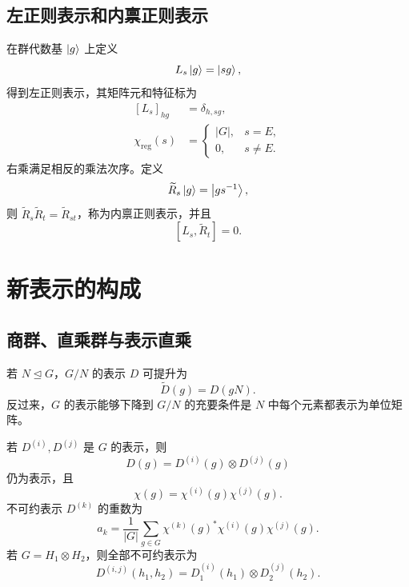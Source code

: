 \subsection{左正则表示和内禀正则表示}
在群代数基 $\Ket{g}$ 上定义
\begin{equation}
L_s\Ket{g}=\Ket{sg},
\end{equation}
得到左正则表示，其矩阵元和特征标为
\begin{align}
\left[L_s\right]_{hg}&=\delta_{h,sg},\\
\chi_{\mathrm{reg}}\left(s\right)&=\begin{cases}\left|G\right|,&s=E,\\0,&s\ne E.
\end{cases}
\end{align}
右乘满足相反的乘法次序。定义
\begin{equation}
\widetilde R_s\Ket{g}=\Ket{gs^{-1}},
\end{equation}
则 $\widetilde R_s\widetilde R_t=\widetilde R_{st}$，称为内禀正则表示，并且
\begin{equation}
\left[L_s,\widetilde R_t\right]=0.
\end{equation}

\section{新表示的构成}
\subsection{商群、直乘群与表示直乘}
若 $N\trianglelefteq G$，$G/N$ 的表示 $D$ 可提升为
\begin{equation}
\widetilde D\left(g\right)=D\left(gN\right).
\end{equation}
反过来，$G$ 的表示能够下降到 $G/N$ 的充要条件是 $N$ 中每个元素都表示为单位矩阵。

若 $D^{\left(i\right)},D^{\left(j\right)}$ 是 $G$ 的表示，则
\begin{equation}
D\left(g\right)=D^{\left(i\right)}\left(g\right)\otimes D^{\left(j\right)}\left(g\right)
\end{equation}
仍为表示，且
\begin{equation}
\chi\left(g\right)=\chi^{\left(i\right)}\left(g\right)\chi^{\left(j\right)}\left(g\right).
\end{equation}
不可约表示 $D^{\left(k\right)}$ 的重数为
\begin{equation}
a_k=\frac{1}{\left|G\right|}\sum_{g\in G}\chi^{\left(k\right)}\left(g\right)^*\chi^{\left(i\right)}\left(g\right)\chi^{\left(j\right)}\left(g\right).
\end{equation}
若 $G=H_1\otimes H_2$，则全部不可约表示为
\begin{equation}
D^{\left(i,j\right)}\left(h_1,h_2\right)=D^{\left(i\right)}_1\left(h_1\right)\otimes D^{\left(j\right)}_2\left(h_2\right).
\end{equation}

